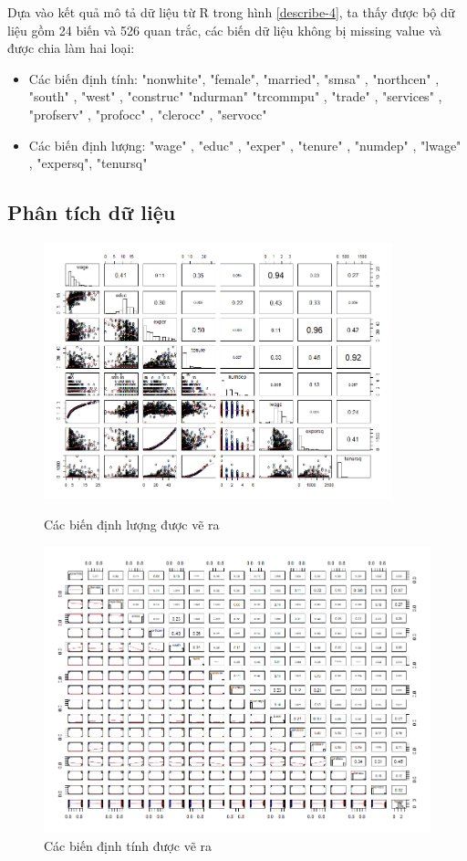 Dựa vào kết quả mô tả dữ liệu từ R trong hình \ref{describe-4}, ta thấy được bộ dữ liệu gồm  24 biến và 526 quan trắc, các biến dữ liệu không bị missing value và được chia làm hai loại:
\begin{itemize}
	\item Các biến định tính: "nonwhite", "female", "married", "smsa"  ,   "northcen" , "south"  ,  "west"  ,   "construc" "ndurman"  "trcommpu" , "trade" ,   "services" , "profserv" , "profocc" , "clerocc" , "servocc" 
	\item Các biến định lượng: "wage"  ,  "educ"  ,  "exper" ,  "tenure" , "numdep" , "lwage" ,  "expersq", "tenursq"
\end{itemize}

\subsection*{Phân tích dữ liệu}
\begin{figure}[H]
	\includegraphics[width=0.9\textwidth]{../Photo Of Result/Plot-dinhluong-data4}
	\caption{Các biến định lượng được vẽ ra}
	\includegraphics[width=\textwidth]{../Photo Of Result/Plot-dinhtinh-data4}
	\caption{Các biến định tính được vẽ ra}
	\label{plot_data4}
\end{figure}

